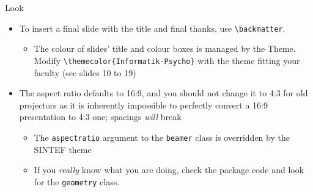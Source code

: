 \begin{frame}[fragile]{Look}
\begin{itemize}
    \item To insert a final slide with the title and final thanks, use \verb|\backmatter|.
    \begin{itemize}
        \item The colour of slides' title and colour boxes is managed by the Theme. Modify \verb|\themecolor{Informatik-Psycho}| with the theme fitting your faculty (see slides 10 to 19)
    \end{itemize}
    \item The aspect ratio defaults to 16:9, and you should not change it to 4:3 for old projectors as it is inherently impossible to perfectly convert a 16:9 presentation to 4:3 one; spacings \emph{will} break
    \begin{itemize}    
        \item The \texttt{aspectratio} argument to the \texttt{beamer} class is overridden by the SINTEF theme
        \item If you \emph{really} know what you are doing, check the package code and look for the \texttt{geometry} class.
    \end{itemize}
\end{itemize}
\end{frame}